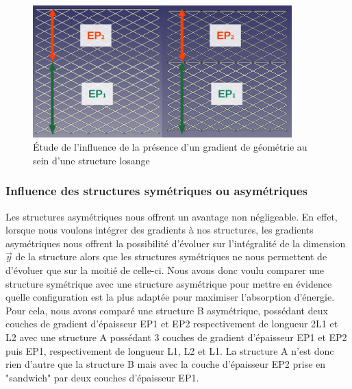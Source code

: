 \documentclass[a4paper]{article}
\begin{document}
	\begin{figure}[H]
		\centering
		\includegraphics[width=10cm]{Images/6/plateaux/plateaux.pdf}
		\caption{Étude de l’influence de la présence d'un gradient de géométrie au sein d'une structure losange}
		\label{plateaux}
	\end{figure}
	\newpage
	
	\subsubsection{Influence des structures symétriques ou asymétriques}
	\label{sym_asym_partie}
	\hspace{0.5cm}Les structures asymétriques nous offrent un avantage non négligeable. En effet, lorsque nous voulons intégrer des gradients à nos structures, les gradients asymétriques nous offrent la possibilité d’évoluer sur l’intégralité de la dimension $\vec{y}$ de la structure alors que les structures symétriques ne nous permettent de d’évoluer que sur la moitié de celle-ci. Nous avons donc voulu comparer une structure symétrique avec une structure asymétrique pour mettre en évidence quelle configuration est la plus adaptée pour maximiser l'absorption d'énergie.\\
	
	Pour cela, nous avons comparé une structure B asymétrique, possédant deux couches de gradient d’épaisseur EP1 et EP2 respectivement de longueur 2L1 et L2 avec une structure A possédant 3 couches de gradient d’épaisseur EP1 et EP2 puis EP1, respectivement de longueur L1, L2 et L1. La structure A n'est donc rien d'autre que la structure B mais avec la couche d'épaisseur EP2 prise en "sandwich" par deux couches d'épaisseur EP1.
	
\end{document}
